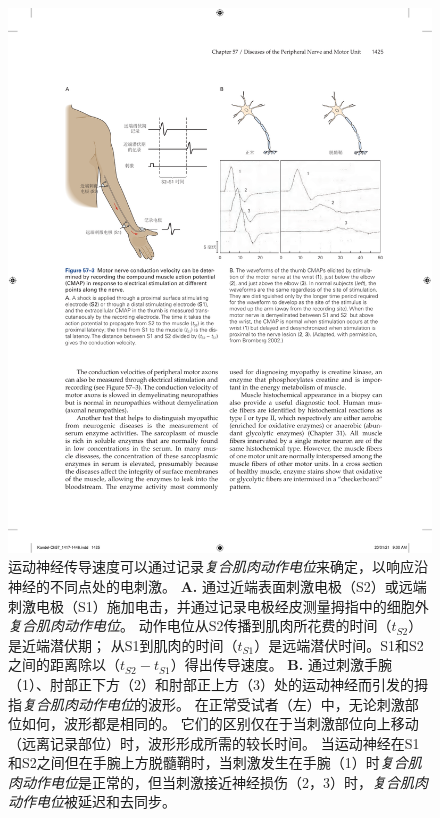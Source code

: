 \begin{figure}[htbp]
	\centering
	\includegraphics[width=1.0\linewidth]{chap57/fig_57_3}
	\caption{运动神经传导速度可以通过记录\textit{复合肌肉动作电位}来确定，以响应沿神经的不同点处的电刺激。
		\textbf{A.} 通过近端表面刺激电极（S2）或远端刺激电极（S1）施加电击，并通过记录电极经皮测量拇指中的细胞外\textit{复合肌肉动作电位}。
		动作电位从S2传播到肌肉所花费的时间（$ t_{S2} $）是近端潜伏期；
		从S1到肌肉的时间（$ t_{S1} $）是远端潜伏时间。S1和S2之间的距离除以（$ t_{S2} - t_{S1} $）得出传导速度。
		\textbf{B.} 通过刺激手腕（1）、肘部正下方（2）和肘部正上方（3）处的运动神经而引发的拇指\textit{复合肌肉动作电位}的波形。
		在正常受试者（左）中，无论刺激部位如何，波形都是相同的。
		它们的区别仅在于当刺激部位向上移动（远离记录部位）时，波形形成所需的较长时间。
		当运动神经在S1和S2之间但在手腕上方脱髓鞘时，当刺激发生在手腕（1）时\textit{复合肌肉动作电位}是正常的，但当刺激接近神经损伤（2，3）时，\textit{复合肌肉动作电位}被延迟和去同步\cite{bromberg2002acute}。}
	\label{fig:57_3}
\end{figure}


